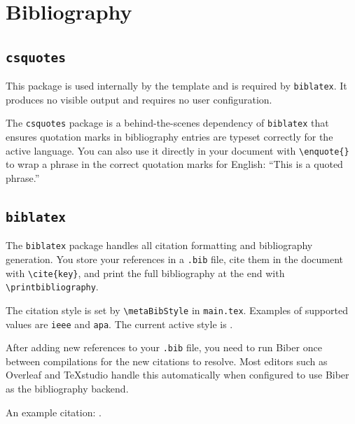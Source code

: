 \section{Bibliography}

\subsection{\texttt{csquotes}}
\noindent\colorbox{themecolour!15}{\parbox{\linewidth}{\small This package is used internally by the template and is required by \texttt{biblatex}. It produces no visible output and requires no user configuration.}}\vspace{0.5\baselineskip}

The \texttt{csquotes} package is a behind-the-scenes dependency of \texttt{biblatex} that ensures quotation marks in bibliography entries are typeset correctly for the active language. You can also use it directly in your document with \texttt{\textbackslash enquote\{\}} to wrap a phrase in the correct quotation marks for English: \enquote{This is a quoted phrase.}

\subsection{\texttt{biblatex}}
The \texttt{biblatex} package handles all citation formatting and bibliography generation. You store your references in a \texttt{.bib} file, cite them in the document with \texttt{\textbackslash cite\{key\}}, and print the full bibliography at the end with \texttt{\textbackslash printbibliography}.

The citation style is set by \texttt{\textbackslash metaBibStyle} in \texttt{main.tex}. Examples of supported values are \texttt{ieee} and \texttt{apa}. The current active style is \texttt{\metaBibStyle}.

After adding new references to your \texttt{.bib} file, you need to run Biber once between compilations for the new citations to resolve. Most editors such as Overleaf and TeXstudio handle this automatically when configured to use Biber as the bibliography backend.

An example citation: \cite{example}.

\newpage
{} %
\printbibliography[heading=bibintoc] %

\appendix %

